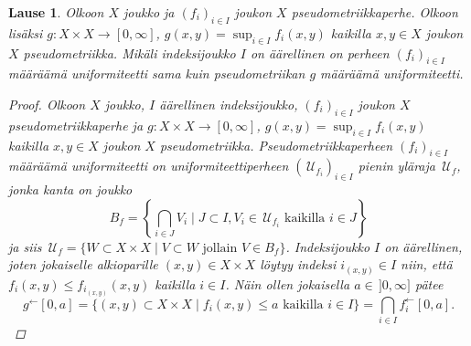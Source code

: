 \documentclass[12pt,a4paper,leqno]{report}
\newcommand{\U}{\,\mathcal{U}}
\newcommand{\Pot}{\mathcal{P}}
\theoremstyle{plain}
\newtheorem{lause}[equation]{Lause}
\theoremstyle{definition}
\theoremstyle{remark}
\begin{document}
\begin{lause}\label{sup ja finite perhe samoja}
%
%
Olkoon $X$ joukko ja 
$(f_i)_{i\in I} $ joukon $X$ pseudometriikkaperhe. 
Olkoon lisäksi $g\colon X\times X\rightarrow [0,\infty]$, 
$g(x,y)=\sup_{i\in I} f_i(x,y)$ kaikilla $x,y\in X$ 
joukon $X$ pseudometriikka. 
Mikäli indeksijoukko $I$ on äärellinen on perheen $(f_i)_{i\in I}$ määräämä 
uniformiteetti sama kuin pseudometriikan $g$ määräämä uniformiteetti.
\begin{proof}
Olkoon $X$ joukko, $I$ äärellinen indeksijoukko, 
$(f_i)_{i\in I} $ joukon $X$ pseudometriikkaperhe ja 
$g\colon X\times X\rightarrow [0,\infty]$, 
$g(x,y)=\sup_{i\in I} f_i(x,y)$ kaikilla $x,y\in X$ 
joukon $X$ pseudometriikka. 
Pseudometriikkaperheen $(f_i)_{i\in I} $ määräämä uniformiteetti on 
uniformiteettiperheen $(\U_{f_i})_{i\in I} $ pienin yläraja $\U_f$, 
jonka kanta on joukko 
$$B_f=\left\{\bigcap_{i\in J}V_i\mid J\subset I, V_i\in \U_{f_i} \text{ kaikilla }i\in J\right\}$$
ja siis 
$\U_f=\{W\subset X\times X\mid V\subset W\text{ jollain }V\in B_f\}$.
%
Indeksijoukko $I$ on äärellinen, 
joten jokaiselle alkioparille $(x,y)\in X\times X$ löytyy indeksi $i_{(x,y)}\in I$ niin, 
että $f_i(x,y)\leq f_{i_{(x,y)}}(x,y)$ kaikilla $i\in I$.
Näin ollen jokaisella $a\in \,]0,\infty]$ pätee  
$$g^\leftarrow[0,a]=\{(x,y)\subset X\times X\mid 
f_i(x,y)\leq a \text{ kaikilla } i\in I
\}=\bigcap_{i\in I} f_i^\leftarrow[0,a].$$

\end{proof}
\end{lause}
\end{document}
